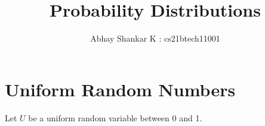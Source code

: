 \documentclass[journal,12pt,twocolumn]{IEEEtran}
\theoremstyle{remark}
\numberwithin{equation}{section}
\numberwithin{equation}{section}
\begin{document}
    \title{Probability Distributions}
    \author{Abhay Shankar K : cs21btech11001}
    
    \newcommand{\e}[1]{\ensuremath{e^{#1}}}
	\providecommand{\pdf}[2]{\ensuremath{p_{#2}\left(#1\right)}}
	\providecommand{\cdf}[2]{\ensuremath{P_{#2}\left(#1\right)}}
    \providecommand{\inv}[1]{\ensuremath{\frac{1}{#1}}}
    \providecommand{\der}[4]{\ensuremath{\frac{#3 #1}{#4 #2}}}
    \providecommand{\oder}[2]{\der{#1}{#2}{d}{d}}
    \providecommand{\pder}[2]{\der{#1}{#2}{\partial}{\partial}}
\maketitle
\tableofcontents
\listoffigures

\newpage

\section{Uniform Random Numbers}

Let $U$ be a uniform random variable between 0 and 1.
\end{document}
